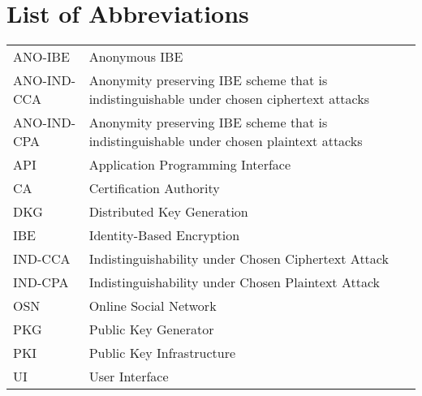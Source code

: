 \documentclass[master=eelt,masteroption=em]{kulemt}
\theoremstyle{plain}
\theoremstyle{definition}
\begin{document}
\chapter{List of Abbreviations}
\begin{flushleft}
  \renewcommand{\arraystretch}{1.1}
  \begin{tabularx}{\textwidth}{@{}p{30mm}X@{}}
    ANO-IBE & Anonymous IBE \\
    ANO-IND-CCA & Anonymity preserving IBE scheme that is indistinguishable under chosen ciphertext attacks \\ 
    ANO-IND-CPA & Anonymity preserving IBE scheme that is indistinguishable under chosen plaintext attacks \\
    API & Application Programming Interface \\
    CA & Certification Authority \\
    DKG   & Distributed Key Generation \\
    IBE   & Identity-Based Encryption \\
    IND-CCA & Indistinguishability under Chosen Ciphertext Attack \\
    IND-CPA  & Indistinguishability under Chosen Plaintext Attack  \\
    OSN & Online Social Network \\
    PKG   & Public Key Generator \\
    PKI & Public Key Infrastructure \\
    UI & User Interface \\
  \end{tabularx}
\end{flushleft}
\end{document}
